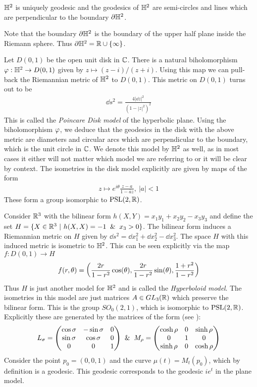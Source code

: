 \begin{proposition}
  $\mathbb{H}^2$ is uniquely geodesic and the geodesics of $\mathbb{H}^2$ are semi-circles and lines which are perpendicular to the boundary ${\partial \mathbb{H}^2}$.
\end{proposition}
\begin{rem}
  Note that the boundary ${\partial \mathbb{H}^2}$ is the boundary of the upper half plane inside the Riemann sphere. Thus ${\partial \mathbb{H}^2} = \mathbb{R}\cup \{\infty\}$.
\end{rem}
Let $D(0,1)$ be the open unit disk in $\mathbb{C}$. There is a natural biholomorphism $\varphi:\mathbb{H}^2\to D(0,1)$ given by $z\mapsto (z-i)/(z+i)$. Using this map we can pull-back the Riemannian metric of $\mathbb{H}^2$ to $D(0,1)$. This metric on $D(0,1)$ turns out to be
\begin{align}
  \dd s^2 = \frac{4|\dd z|^2}{(1-|z|^2)^2}
\end{align}
This is called the \textit{Poincare Disk model} of the hyperbolic plane. Using the biholomorphism $\varphi$, we deduce that the geodesics in the disk with the above metric are diameters and circular arcs which are perpendicular to the boundary, which is the unit circle in $\mathbb{C}$. We denote this model by $\mathbb{H}^2$ as well, as in most cases it either will not matter which model we are referring to or it will be clear by context. The isometries in the disk model explicitly are given by maps of the form
\begin{align}
  z\mapsto e^{i\theta}\frac{z-a}{1-\bar{a}z},\ |a|<1
\end{align}
These form a group isomorphic to $\text{PSL}(2,\mathbb{R})$.

Consider $\mathbb{R}^3$ with the bilinear form $h(X,Y) = x_1y_1 + x_2y_2 - x_3y_3$ and define the set $H = \{X\in \R^3\ |\ h(X,X) = -1 \And x_3>0\}$. The bilinear form induces a Riemannian metric on $H$ given by $\dd s^2 = \dd x_1^2 + \dd x_2^2 -\dd x_3^2$. The space $H$ with this induced metric is isometric to $\mathbb{H}^2$. This can be seen explicitly via the map $f:D(0,1)\to H$
\begin{align}
  f(r,\theta) = \left(\frac{2r}{1-r^2}\cos(\theta), \frac{2r}{1-r^2}\sin(\theta), \frac{1+r^2}{1-r^2}\right)
\end{align}
Thus $H$ is just another model for $\mathbb{H}^2$ and is called the \textit{Hyperboloid model}. The isometries in this model are just matrices $A\in GL_3(\mathbb{R})$ which preserve the bilinear form. This is the group $SO_0(2,1)$, which is isomorphic to $\text{PSL}(2,\mathbb{R})$. Explicitly these are generated by the matrices of the form (see \cite{buser}):
\begin{align}
  L_\sigma = \begin{pmatrix}\cos\sigma & -\sin\sigma & 0\\ \sin\sigma & \cos\sigma & 0\\ 0 & 0 &1\end{pmatrix} \And
  M_\rho = \begin{pmatrix}\cosh\rho & 0& \sinh\rho \\  0 & 1 &0\\ \sinh\rho & 0 & \cosh\rho \end{pmatrix}
\end{align}
Consider the point $p_0= (0,0,1)$ and the curve $\mu(t) = M_t(p_0)$, which by definition is a geodesic. This geodesic corresponds to the geodesic $ie^t$ in the plane model. 
%
